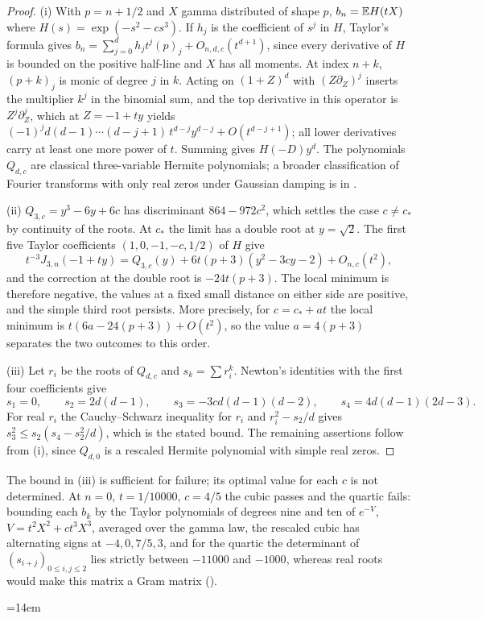 \begin{proof}
(i) With $p=n+1/2$ and $X$ gamma distributed of shape $p$, $b_n=\mathbb{E} H(tX)$ where
$H(s)=\exp(-s^2-cs^3)$. If $h_j$ is the coefficient of $s^j$ in $H$, Taylor's formula gives
$b_n=\sum_{j=0}^dh_jt^j(p)_j+O_{n,d,c}(t^{d+1})$, since every derivative of $H$ is bounded on the positive
half-line and $X$ has all moments. At index $n+k$, $(p+k)_j$ is monic of degree $j$ in $k$. Acting on
$(1+Z)^d$ with $(Z\partial_Z)^j$ inserts the multiplier $k^j$ in the binomial sum, and the top derivative
in this operator is $Z^j\partial_Z^j$, which at $Z=-1+ty$ yields
$(-1)^jd(d-1)\cdots(d-j+1)\,t^{d-j}y^{d-j}+O(t^{d-j+1})$; all lower derivatives carry at least one more
power of $t$. Summing gives $H(-D)y^d$. The polynomials $Q_{d,c}$ are classical three-variable Hermite
polynomials; a broader classification of Fourier transforms with only real zeros under Gaussian damping
is in \cite{Newman1976Fourier}.

(ii) $Q_{3,c}=y^3-6y+6c$ has discriminant $864-972c^2$, which settles the case $c\ne c_*$ by continuity of
the roots. At $c_*$ the limit has a double root at $y=\sqrt2$. The first five Taylor coefficients
$(1,0,-1,-c,1/2)$ of $H$ give
\[
 t^{-3}J_{3,n}(-1+ty)=Q_{3,c}(y)+6t(p+3)(y^2-3cy-2)+O_{n,c}(t^2),
\]
and the correction at the double root is $-24t(p+3)$. The local minimum is therefore negative, the values
at a fixed small distance on either side are positive, and the simple third root persists. More precisely,
for $c=c_*+at$ the local minimum is $t(6a-24(p+3))+O(t^2)$, so the value $a=4(p+3)$ separates the two
outcomes to this order.

(iii) Let $r_i$ be the roots of $Q_{d,c}$ and $s_k=\sum r_i^k$. Newton's identities with the first four
coefficients give
\[
 s_1=0,\qquad s_2=2d(d-1),\qquad s_3=-3cd(d-1)(d-2),\qquad s_4=4d(d-1)(2d-3).
\]
For real $r_i$ the Cauchy--Schwarz inequality for $r_i$ and $r_i^2-s_2/d$ gives
$s_3^2\le s_2(s_4-s_2^2/d)$, which is the stated bound. The remaining assertions follow from (i), since
$Q_{d,0}$ is a rescaled Hermite polynomial with simple real zeros.
\end{proof}

The bound in (iii) is sufficient for failure; its optimal value for each $c$ is not determined. At $n=0$,
$t=1/10000$, $c=4/5$ the cubic passes and the quartic fails: bounding each $b_k$ by the Taylor polynomials
of degrees nine and ten of $e^{-V}$, $V=t^2X^2+ct^3X^3$, averaged over the gamma law, the rescaled cubic
has alternating signs at $-4,0,7/5,3$, and for the quartic the determinant of $(s_{i+j})_{0\le i,j\le2}$
lies strictly between $-11000$ and $-1000$, whereas real roots would make this matrix a Gram matrix
().
{\emergencystretch=14em\par}

